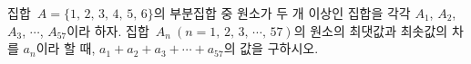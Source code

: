 집합~$A=\{1,\,2,\,3,\,4,\,5,\,6\}$의 부분집합 중 원소가 두 개 이상인 집합을 각각 $A_1$, $A_2$, $A_3$, $\cdots$, $A_{57}$이라 하자. 집합~$A_n\ (n=1,\,2,\,3,\,\cdots,\,57)$의 원소의 최댓값과 최솟값의 차를 $a_n$이라 할 때, $a_1+a_2+a_3+\cdots+a_{57}$의 값을 구하시오.

